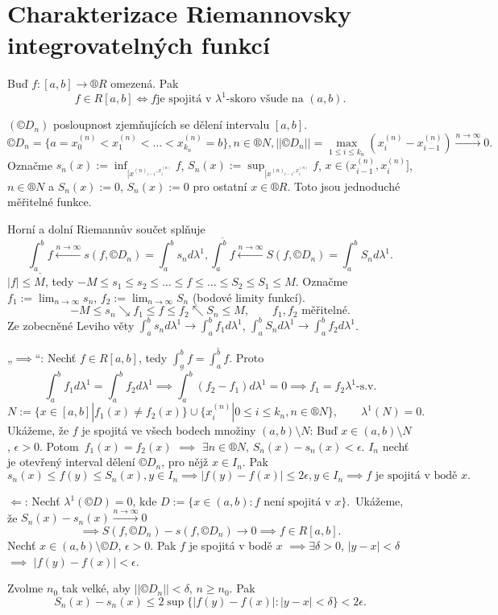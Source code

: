\documentclass[12pt]{article}					%
\begin{document}
\section{Charakterizace Riemannovsky integrovatelných funkcí}
\begin{veta}
	Buď $f: [a, b] \rightarrow ®R$ omezená. Pak
	$$ f \in R[a, b] \Leftrightarrow f \text{je spojitá v $\lambda^1$-skoro všude na $(a, b)$}. $$

	\begin{dukazin}
		$(©D_n)$ posloupnost zjemňujících se dělení intervalu $[a, b]$.
		$$ ©D_n = \{a = x_0^{(n)} < x_1^{(n)} < … < x_{k_n}^{(n)} = b\}, n \in ®N, ||©D_n|| = \max_{1 ≤ i ≤ k_n} (x_i^{(n)} - x_{i-1}^{(n)}) \stackrel{n \rightarrow ∞}{\rightarrow} 0. $$
		Označme $s_n(x) := \inf_{[x^{(n)_{i-1}, x_i^{(n)}}} f$, $S_n(x) := \sup_{[x^{(n)_{i-1}, x_i^{(n)}}} f$, $x \in (x_{i-1}^{(n)}, x_i^{(n)}]$, $n \in ®N$ a $S_n(x) := 0$, $S_n(x):= 0$ pro ostatní $x \in ®R$. Toto jsou jednoduché měřitelné funkce.

		Horní a dolní Riemannův součet splňuje
		$$ \underline{\int_a^b f} \stackrel{n \rightarrow ∞}{\leftarrow} s(f, ©D_n) = \int_a^b s_n d\lambda^1, \overline{\int_a^b f} \stackrel{n \rightarrow ∞}{\leftarrow} S(f, ©D_n) = \int_a^b S_n d\lambda^1. $$
		$|f| ≤ M$, tedy $-M ≤ s_1 ≤ s_2 ≤ … ≤ f ≤ … ≤ S_2 ≤ S_1 ≤ M$. Označme $f_1 := \lim_{n \rightarrow ∞} s_n$, $f_2 := \lim_{n \rightarrow ∞} S_n$ (bodové limity funkcí).
		$$ -M ≤ s_n \searrow f_1 ≤ f ≤ f_2 \nwarrow S_n ≤ M, \qquad f_1, f_2 \text{ měřitelné}. $$
		Ze zobecněné Leviho věty $\int_a^b s_n d\lambda^1 \rightarrow \int_a^b f_1 d\lambda^1$, $\int_a^b S_n d\lambda^1 \rightarrow \int_a^b f_2 d \lambda^1$.

		„$\implies$“: Nechť $f \in R[a, b]$, tedy $\underline{\int_a^b f} = \overline{\int_a^b f}$. Proto
		$$ \int_a^b f_1 d\lambda^1 = \int_a^b f_2 d \lambda^1 \implies \int_a^b (f_2 - f_1) d\lambda^1 = 0 \implies f_1 = f_2 \lambda^1\text{-s.v.} $$
		$$ N := \{x \in [a, b] | f_1(x) ≠ f_2(x)\} \cup \{x_i^{(n)} | 0 ≤ i ≤ k_n, n \in ®N\}, \qquad \lambda^1(N) = 0. $$
		Ukážeme, že $f$ je spojitá ve všech bodech množiny $(a, b) \setminus N$: Buď $x \in (a, b) \setminus N$, $\epsilon > 0$. Potom $f_1(x) = f_2(x)$ $\implies$ $\exists n \in ®N$, $S_n(x) - s_n(x) < \epsilon$. $I_n$ nechť je otevřený interval dělení $©D_n$, pro nějž $x \in I_n$. Pak
		$$ s_n(x) ≤ f(y) ≤ S_n(x), y \in I_n \implies |f(y) - f(x)| ≤ 2\epsilon, y \in I_n \implies f \text{ je spojitá v bodě $x$.} $$

		$\Leftarrow$: Nechť $\lambda^1(©D) = 0$, kde $D := \{x \in (a, b): f\text{ není spojitá v }x\}$. Ukážeme, že $S_n(x) - s_n(x) \stackrel{n \rightarrow ∞}{\rightarrow} 0$
		$$ \implies S(f, ©D_n) - s(f, ©D_n) \rightarrow 0 \implies f \in R[a, b]. $$
		Nechť $x \in (a, b) \setminus ©D$, $\epsilon > 0$. Pak $f$ je spojitá v bodě $x$ $\implies \exists \delta > 0$, $|y - x| < \delta$ $\implies$ $|f(y) - f(x)| < \epsilon$.

		Zvolme $n_0$ tak velké, aby $||©D_n|| < \delta$, $n ≥ n_0$. Pak 
		$$ S_n(x) - s_n(x) ≤ 2 \sup\{|f(y) - f(x)|: |y - x| < \delta\} < 2\epsilon. $$
	\end{dukazin}
\end{veta}
\end{document}
